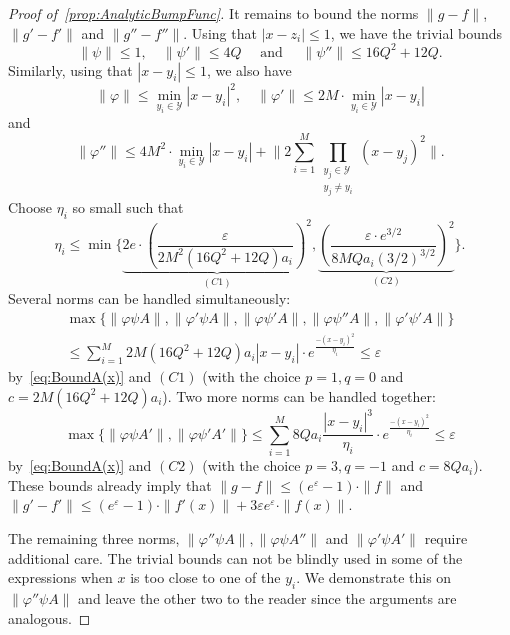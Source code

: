 \documentclass[12pt,]{article}
\theoremstyle{definition}
\theoremstyle{remark}
\newcommand{\0}{\mathbf{0}}
\begin{document}
{\begin{proof}[Proof of~\cref{prop:AnalyticBumpFunc}]
It remains to bound the norms $\|g-f\|$, $\|g'-f'\|$ and $\|g''-f''\|$. Using that $|x-z_i|\leq 1$, we have the trivial bounds
\begin{equation*}
\|\psi\| \leq 1, \quad \|\psi'\| \leq 4Q \quad\text{ and }\quad  \|\psi''\| \leq 16Q^2+12Q.
\end{equation*}
Similarly, using that $|x-y_i|\leq 1$, we also have
\begin{equation*}
\|\varphi\| \leq \min_{y_i\in\mathcal{Y}} |x-y_i|^2, \quad \|\varphi'\| \leq 2M\cdot\min_{y_i\in\mathcal{Y}} |x-y_i|  
\end{equation*} 
and
\begin{equation*}
\|\varphi''\| \leq 4M^2\cdot \min_{y_i\in\mathcal{Y}} |x-y_i| + \bigg\|2\sum_{i=1}^{M}  \prod_{\substack{y_j\in\mathcal{Y}\\ y_j\neq y_i}} (x-y_j)^2\bigg\|.
\end{equation*}
Choose $\eta_i$ so small such that
\begin{equation*}
\eta_i \leq \min \bigg\{ \underbrace{2e\cdot \left(\frac{\varepsilon}{2M^2(16Q^2+12Q)a_i}\right)^2 }_{(C1)}, \underbrace{ \left(\frac{\varepsilon\cdot e^{3/2}}{8MQa_i(3/2)^{3/2}}\right)^2}_{(C2)}\bigg\}.
\end{equation*}
Several norms can be handled simultaneously:
\begin{multline*}
\max\{ \|\varphi \psi A\|,\|\varphi' \psi A\|, \|\varphi \psi' A\|, \|\varphi \psi'' A\|, \|\varphi' \psi' A\| \} \\
\leq \sum_{i=1}^M 2M(16Q^2+12Q)a_i |x-y_i| \cdot e^{\frac{-(x-y_i)^2}{\eta_i}} \leq \varepsilon
\end{multline*}
by~\cref{eq:BoundA(x)} and $(C1)$ (with the choice $p=1, q=0$ and $c=2M(16Q^2+12Q)a_i$). Two more norms can be handled together:
\begin{equation*}
\max\{ \|\varphi \psi A'\|, \|\varphi \psi' A'\| \}
	\leq \sum_{i=1}^M 8Qa_i \frac{|x-y_i|^3}{\eta_i} \cdot e^{\frac{-(x-y_i)^2}{\eta_i}} \leq \varepsilon
\end{equation*}
by~\cref{eq:BoundA(x)} and $(C2)$ (with the choice $p=3, q=-1$ and $c=8Qa_i$). These bounds already imply that $\|g-f\|\leq (e^{\varepsilon}-1)\cdot \|f\|$ and $\|g'-f'\|\leq  (e^{\varepsilon}-1)\cdot\|f'(x)\|+3\varepsilon e^{\varepsilon} \cdot\|f(x)\|$.

The remaining three norms, $\|\varphi'' \psi A\|,\|\varphi \psi A''\|$ and $\|\varphi' \psi A'\|$ require additional care. The trivial bounds can not be blindly used in some of the expressions when $x$ is too close to one of the $y_i$. We demonstrate this on $\|\varphi'' \psi A\|$ and leave the other two to the reader since the arguments are analogous.


\end{proof}}
\end{document}

